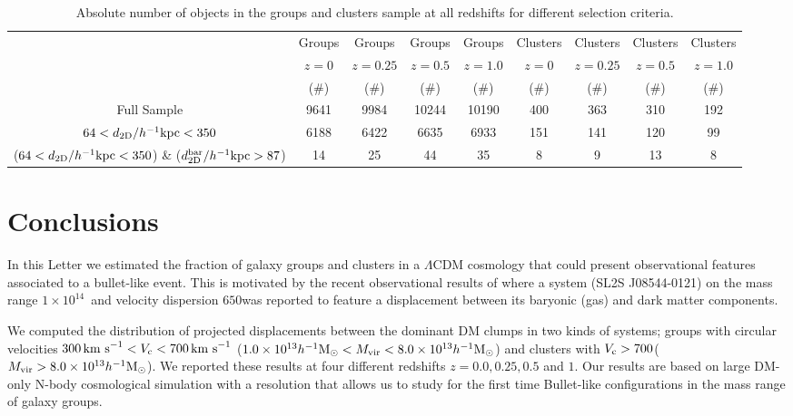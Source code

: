 \documentclass{emulateapj}
\newcommand{\hkpc}{{\ifmmode{h^{-1}{\rm kpc}}\else{$h^{-1}$kpc }\fi}}
\newcommand{\hMsun}{{\ifmmode{h^{-1}{\rm {M_{\odot}}}}\else{$h^{-1}{\rm{M_{\odot}}}$}\fi}}
\newcommand{\kms}{{\ifmmode{{\mathrm{\,km\ s}^{-1}}}\else{\,km~s$^{-1}$}\fi}}
\newcommand{\bullg}{SL2S J08544-0121}
\begin{document}
  
\begin{table}
\begin{center}
\begin{tabular}{ccccccccc}\hline\hline
        & Groups & Groups & Groups & Groups & Clusters & Clusters & Clusters & Clusters\\
  & $z=0$   & $z=0.25$   & $z=0.5$   & $z=1.0$   & $z=0$   & $z=0.25$   & $z=0.5$   & $z=1.0$ \\
  & ($\# $)    & ($\# $)    & ($\# $)    & ($\# $)    & ($\# $)    & ($\# $)    & ($\# $)    & ($\# $)  \\\hline
Full Sample & 9641 & 9984 & 10244 & 10190 & 400  & 363 & 310 & 192 \\
$64 <d_{\rm 2D}/\hkpc< 350$ & 6188 & 6422 & 6635 & 6933 & 151 &
141 & 120 & 99\\
($64 <d_{\rm 2D}/\hkpc< 350 $) \& ($d_{\rm 2D}^{\rm bar}/\hkpc >87$) & 14 & 25 & 44 & 35 & 8 & 9 & 13 & 8 \\\hline\hline
\end{tabular}
\caption{Absolute number of objects in the groups and clusters sample
  at all redshifts for different selection criteria. }
\label{table:numbers}
\end{center}
\end{table}





\section{Conclusions}
\label{sec:conclusions}

In this Letter we estimated the fraction of galaxy groups and clusters
in a $\Lambda$CDM cosmology that could present observational features
associated to a bullet-like event. This is motivated by the recent
observational results of \cite{Gastaldello} where a system (\bullg)
on the mass range $1\times 10^{14}$\hMsun\ and velocity dispersion
$650$\kms was reported to feature a displacement between its baryonic
(gas) and dark matter components. 

We computed the distribution of projected displacements
between the dominant DM clumps in two kinds of systems; groups with
circular velocities $300\kms<V_{\rm c}<700\kms$ ($1.0\times
10^{13}\hMsun < M_{\rm vir}<8.0\times 10^{13}\hMsun$) and clusters with $V_{\rm
  c}>700$\kms ($M_{\rm vir}>8.0\times 10^{13}\hMsun$). We reported these
results at four different redshifts $z=0.0,0.25,0.5$ and $1$. Our
results are based on large DM-only N-body cosmological simulation with
a resolution that allows us to study for the first time Bullet-like
configurations in the mass range of galaxy groups. 
\end{document}
